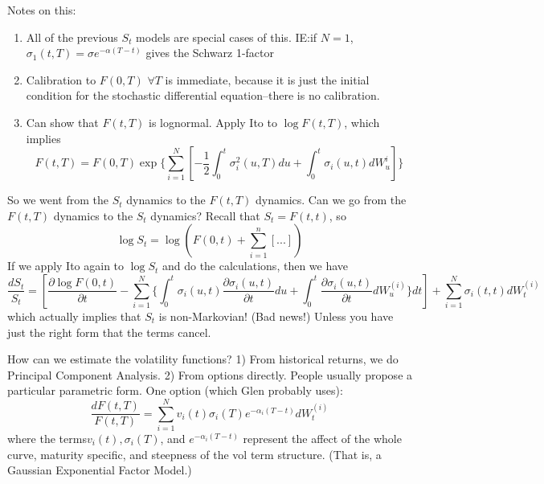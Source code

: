 \documentclass[twocolumn,openany]{book}
\begin{document}
Notes on this: 
\begin{enumerate}
	\item All of the previous $S_t$ models are special cases of this. IE:if $N=1$, $\sigma_1(t,T) = \sigma e^{-\alpha(T-t)}$ gives the Schwarz 1-factor
	\item Calibration to $F(0,T)$ $\forall T$ is immediate, because it is just the initial condition for the stochastic differential equation--there is no calibration.
	
	\item Can show that $F(t,T)$ is lognormal. Apply Ito to $\log F(t,T)$, which implies
	\begin{equation}
		F(t,T) = F(0,T) \exp \{\sum_{i=1}^N \left[-\frac12 \int_0^t \sigma_i^2(u,T)du + \int_0^t \sigma_i(u,t)dW_u^i\right]  \}
	\end{equation}
	
\end{enumerate}

So we went from the $S_t$ dynamics to the $F(t,T)$ dynamics. Can we go from the $F(t,T)$ dynamics to the $S_t$ dynamics? Recall that $S_t=F(t,t)$, so
\begin{equation}
	\log S_t = \log (F(0,t) + \sum_{i=1}^n \left[ ... \right] )
\end{equation}
If we apply Ito again to $\log S_t$ and do the calculations, then we have
\begin{equation}
	\frac{dS_t}{S_t} = \left[ \frac{\partial \log F(0,t)}{\partial t} - \sum_{i=1}^N \{ \int_0^t \sigma_i(u,t) \frac{\partial \sigma_i(u,t)}{\partial t} du + \int_0^t \frac{\partial \sigma_i(u,t)}{\partial t} dW_u^{(i)}\} dt\right] + \sum_{i=1}^N \sigma_i(t,t) dW_t^{(i)}
\end{equation}
which actually implies that $S_t$ is non-Markovian! (Bad news!) Unless you have just the right form that the terms cancel.

How can we estimate the volatility functions? 1) From historical returns, we do Principal Component Analysis. 2) From options directly. People usually propose a particular parametric form. One option (which Glen probably uses):
\begin{equation}
	\frac{d F(t,T)}{F(t,T)} = \sum_{i=1}^N v_i(t) \sigma_i(T) e^{-\alpha_i (T-t)}dW_t^{(i)}
\end{equation}
where the terms$ v_i(t), \sigma_i(T)$, and $e^{-\alpha_i (T-t)}$ represent the affect of the whole curve, maturity specific, and steepness of the vol term structure. (That is, a Gaussian Exponential Factor Model.)
\end{document}
